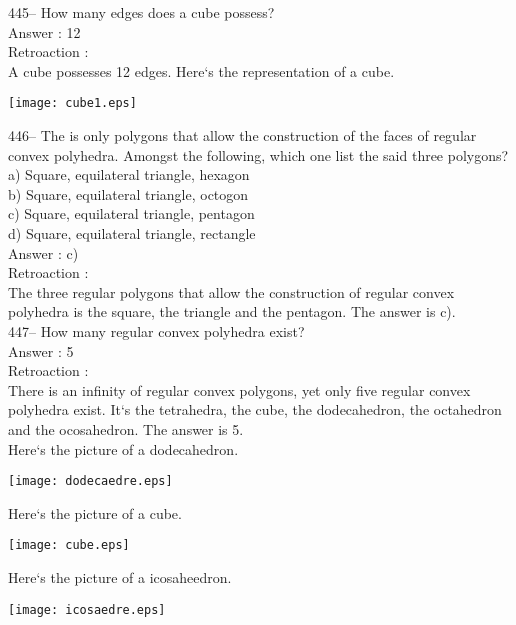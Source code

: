 ﻿\documentclass[letterpaper, 12pt]{article}
\begin{document}
445-- How many edges does a cube possess?\\

Answer : 12\\

Retroaction : \\
A cube possesses 12 edges. Here`s the representation of a cube.\\
    \begin{center}
    \texttt{[image: cube1.eps]}
    \end{center}



446-- The is only polygons that allow the construction of the faces of regular convex polyhedra. 
Amongst the following, which one list the said three polygons?\\
a) Square, equilateral triangle, hexagon\\
b) Square, equilateral triangle, octogon\\
c) Square, equilateral triangle, pentagon\\
d) Square, equilateral triangle, rectangle\\


Answer : c)\\

Retroaction : \\
The three regular polygons that allow the construction of regular convex polyhedra is the square, the triangle and the pentagon.  The answer is c).\\

447-- How many regular convex polyhedra exist?\\

Answer : 5\\

Retroaction : \\
There is an infinity of regular convex polygons, yet only five regular convex polyhedra exist. It`s the tetrahedra, the cube, the dodecahedron, the octahedron and the ocosahedron.
The answer is 5.\\
Here`s the picture of a dodecahedron.\\
    \begin{center}
    \texttt{[image: dodecaedre.eps]}
    \end{center}
Here`s the picture of a cube.\\
    \begin{center}
    \texttt{[image: cube.eps]}
    \end{center}
Here`s the picture of a icosaheedron.\\
    \begin{center}
    \texttt{[image: icosaedre.eps]}
    \end{center}
\end{document}
